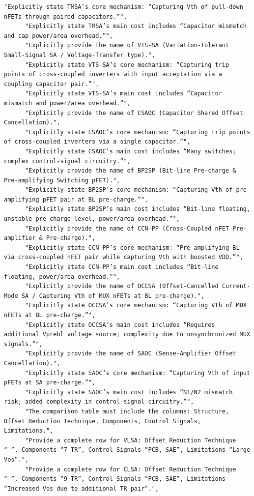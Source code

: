 \documentclass[11pt]{article}
\begin{document}
\begin{tcolorbox}[
  breakable,
  colback=porcelain,
  colframe=gray!75!black,
  left=6pt, right=6pt, top=6pt, bottom=6pt,
  fontupper=\small
]
\begin{lstlisting}[basicstyle=\ttfamily\footnotesize, breaklines=true, frame=none, numbers=none]
      "Explicitly state TMSA’s core mechanism: “Capturing Vth of pull-down nFETs through paired capacitors.”",
      "Explicitly state TMSA’s main cost includes “Capacitor mismatch and cap power/area overhead.”",
      "Explicitly provide the name of VTS-SA (Variation-Tolerant Small-Signal SA / Voltage-Transfer type).",
      "Explicitly state VTS-SA’s core mechanism: “Capturing trip points of cross-coupled inverters with input acceptation via a coupling capacitor pair.”",
      "Explicitly state VTS-SA’s main cost includes “Capacitor mismatch and power/area overhead.”",
      "Explicitly provide the name of CSAOC (Capacitor Shared Offset Cancellation).",
      "Explicitly state CSAOC’s core mechanism: “Capturing trip points of cross-coupled inverters via a single capacitor.”",
      "Explicitly state CSAOC’s main cost includes “Many switches; complex control-signal circuitry.”",
      "Explicitly provide the name of BP2SP (Bit-line Pre-charge & Pre-amplifying Switching pFET).",
      "Explicitly state BP2SP’s core mechanism: “Capturing Vth of pre-amplifying pFET pair at BL pre-charge.”",
      "Explicitly state BP2SP’s main cost includes “Bit-line floating, unstable pre-charge level, power/area overhead.”",
      "Explicitly provide the name of CCN-PP (Cross-Coupled nFET Pre-amplifier & Pre-charge).",
      "Explicitly state CCN-PP’s core mechanism: “Pre-amplifying BL via cross-coupled nFET pair while capturing Vth with boosted VDD.”",
      "Explicitly state CCN-PP’s main cost includes “Bit-line floating, power/area overhead.”",
      "Explicitly provide the name of OCCSA (Offset-Cancelled Current-Mode SA / Capturing Vth of MUX nFETs at BL pre-charge).",
      "Explicitly state OCCSA’s core mechanism: “Capturing Vth of MUX nFETs at BL pre-charge.”",
      "Explicitly state OCCSA’s main cost includes “Requires additional Vprebl voltage source; complexity due to unsynchronized MUX signals.”",
      "Explicitly provide the name of SAOC (Sense-Amplifier Offset Cancellation).",
      "Explicitly state SAOC’s core mechanism: “Capturing Vth of input pFETs at SA pre-charge.”",
      "Explicitly state SAOC’s main cost includes “N1/N2 mismatch risk; added complexity in control-signal circuitry.”",
      "The comparison table must include the columns: Structure, Offset Reduction Technique, Components, Control Signals, Limitations.",
      "Provide a complete row for VLSA: Offset Reduction Technique “–”, Components “7 TR”, Control Signals “PCB, SAE”, Limitations “Large Vos”.",
      "Provide a complete row for CLSA: Offset Reduction Technique “–”, Components “9 TR”, Control Signals “PCB, SAE”, Limitations “Increased Vos due to additional TR pair”.",

\end{lstlisting}
\end{tcolorbox}
\end{document}

